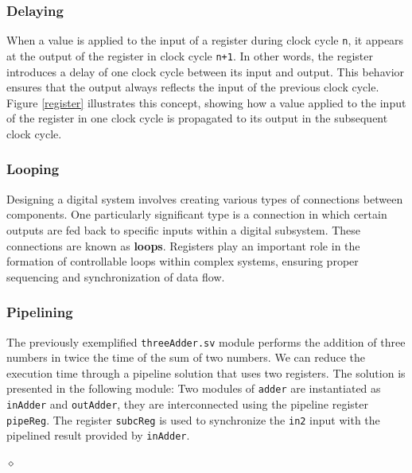 \subsubsection{Delaying}
When a value is applied to the input of a register during clock cycle {\tt n}, it appears at the output of the register in clock cycle {\tt n+1}. In other words, the register introduces a delay of one clock cycle between its input and output. This behavior ensures that the output always reflects the input of the previous clock cycle. Figure \ref{register} illustrates this concept, showing how a value applied to the input of the register in one clock cycle is propagated to its output in the subsequent clock cycle.


\subsubsection{Looping}
Designing a digital system involves creating various types of connections between components. One particularly significant type is a connection in which certain outputs are fed back to specific inputs within a digital subsystem. These connections are known as {\bf loops}. Registers play an important role in the formation of controllable loops within complex systems, ensuring proper sequencing and synchronization of data flow.

\subsubsection{Pipelining}
\begin{exemplu}
The previously exemplified {\tt threeAdder.sv} module performs the addition of three numbers in twice the time of the sum of two numbers. We can reduce the execution time through a pipeline solution that uses two registers. The solution is presented in the following module:
{\em
{}
}  
Two modules of {\tt adder} 
are instantiated as {\tt inAdder} and {\tt outAdder}, they are
interconnected using the pipeline  register {\tt pipeReg}. The register {\tt subcReg} is used to synchronize the {\tt in2} input with the pipelined result provided by {\tt inAdder}.

$\diamond$
\end{exemplu}


